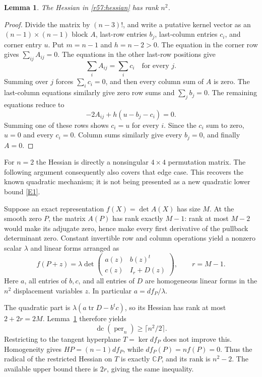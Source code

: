 \documentclass[11pt,a4paper]{article}
\newcommand{\C}{\mathbb{C}}
\newcommand{\eref}[2]{\hyperlink{extra:#1:#2}{[E#2]}}
\newtheorem{notebooklemma}{Lemma}[section]
\numberwithin{equation}{section}
\begin{document}
\begin{notebooklemma}\label{r57:fullrank}
The Hessian in \eqref{r57:hessian} has rank $n^2$.
\end{notebooklemma}
\begin{proof}
Divide the matrix by $(n-3)!$, and write a putative kernel vector as an $(n-1)\times(n-1)$ block $A$, last-row entries $b_j$, last-column entries $c_i$, and corner entry $u$. Put $m=n-1$ and $h=n-2>0$. The equation in the corner row gives $\sum_{ij}A_{ij}=0$. The equations in the other last-row positions give
\[
 \sum_i A_{ij}=\sum_i c_i\quad\text{for every }j.
\]
Summing over $j$ forces $\sum_i c_i=0$, and then every column sum of $A$ is zero. The last-column equations similarly give zero row sums and $\sum_jb_j=0$. The remaining equations reduce to
\[
 -2A_{ij}+h(u-b_j-c_i)=0.
\]
Summing one of these rows shows $c_i=u$ for every $i$. Since the $c_i$ sum to zero, $u=0$ and every $c_i=0$. Column sums similarly give every $b_j=0$, and finally $A=0$.
\end{proof}

For $n=2$ the Hessian is directly a nonsingular $4\times4$ permutation matrix. The following argument consequently also covers that edge case. This recovers the known quadratic mechanism; it is not being presented as a new quadratic lower bound \eref{statement}{1}.

Suppose an exact representation $f(X)=\det A(X)$ has size $M$. At the smooth zero $P$, the matrix $A(P)$ has rank exactly $M-1$: rank at most $M-2$ would make its adjugate zero, hence make every first derivative of the pullback determinant zero. Constant invertible row and column operations yield a nonzero scalar $\lambda$ and linear forms arranged as
\begin{equation}\label{r57:normalform}
 f(P+z)=\lambda\det\begin{pmatrix}
 a(z)&b(z)^t\\ c(z)&I_r+D(z)
 \end{pmatrix},\qquad r=M-1.
\end{equation}
Here $a$, all entries of $b,c$, and all entries of $D$ are homogeneous linear forms in the $n^2$ displacement variables $z$. In particular $a=df_P/\lambda$.

The quadratic part is $\lambda(a\operatorname{tr}D-b^tc)$, so its Hessian has rank at most $2+2r=2M$. Lemma~\ref{r57:fullrank} therefore yields
\begin{equation}\label{r57:quadraticbound}
 \operatorname{dc}(\operatorname{per}_n)\geq\lceil n^2/2\rceil.
\end{equation}
Restricting to the tangent hyperplane $T=\ker df_P$ does not improve this. Homogeneity gives $HP=(n-1)df_P$, while $df_P(P)=nf(P)=0$. Thus the radical of the restricted Hessian on $T$ is exactly $\C P$, and its rank is $n^2-2$. The available upper bound there is $2r$, giving the same inequality.
\end{document}
